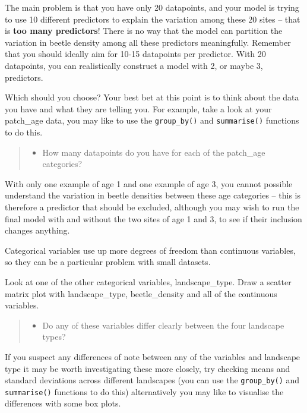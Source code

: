 \documentclass[
]{book}
\providecommand{\tightlist}{%
  \setlength{\itemsep}{0pt}\setlength{\parskip}{0pt}}
\begin{document}
The main problem is that you have only 20 datapoints, and your model is trying to use 10 different predictors to explain the variation among these 20 sites -- that is \textbf{too many predictors}! There is no way that the model can partition the variation in beetle density among all these predictors meaningfully. Remember that you should ideally aim for 10-15 datapoints per predictor. With 20 datapoints, you can realistically construct a model with 2, or maybe 3, predictors.

Which should you choose? Your best bet at this point is to think about the data you have and what they are telling you. For example, take a look at your patch\_age data, you may like to use the \texttt{group\_by()} and \texttt{summarise()} functions to do this.

\begin{quote}
\begin{itemize}
\tightlist
\item
  How many datapoints do you have for each of the patch\_age categories?
\end{itemize}
\end{quote}

With only one example of age 1 and one example of age 3, you cannot possible understand the variation in beetle densities between these age categories -- this is therefore a predictor that should be excluded, although you may wish to run the final model with and without the two sites of age 1 and 3, to see if their inclusion changes anything.

Categorical variables use up more degrees of freedom than continuous variables, so they can be a particular problem with small datasets.

Look at one of the other categorical variables, landscape\_type. Draw a scatter matrix plot with landscape\_type, beetle\_density and all of the continuous variables.

\begin{quote}
\begin{itemize}
\tightlist
\item
  Do any of these variables differ clearly between the four landscape types?
\end{itemize}
\end{quote}

If you suspect any differences of note between any of the variables and landscape type it may be worth investigating these more closely, try checking means and standard deviations across different landscapes (you can use the \texttt{group\_by()} and \texttt{summarise()} functions to do this) alternatively you may like to visualise the differences with some box plots.
\end{document}
